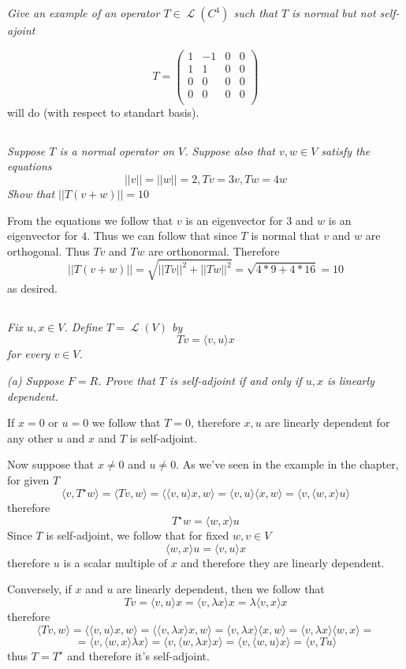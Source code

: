 \documentclass[11pt,oneside,titlepage]{book}
\DeclareMathOperator \map {\mathcal {L}}
\newcommand{\eangle}[1]{\langle #1 \rangle}
\begin{document}
\textit{Give an example of an operator $T \in \map(C^4)$ such that $T$ is normal
  but not self-ajoint}

$$T =
\begin{pmatrix}
  1 & -1 & 0 & 0 \\
  1 & 1 & 0 & 0 \\
  0 & 0 & 0 & 0 \\
  0 & 0 & 0 & 0 \\
\end{pmatrix}
$$
will do (with respect to standart basis).

\subsection{}

\textit{Suppose $T$ is a normal operator on $V$. Suppose also that $v, w \in V$ satisfy the
  equations
  $$||v|| = ||w|| = 2, Tv = 3v, Tw = 4w$$
  Show that $||T(v + w)|| = 10$
}

From the equations we follow that $v$ is an eigenvector for $3$ and $w$ is an eigenvector for $4$.
Thus we can follow that since $T$ is normal that $v$ and $w$ are orthogonal. Thus
$Tv$ and $Tw$ are orthonormal. Therefore 
$$||T(v + w)|| = \sqrt{||Tv||^2 + ||Tw||^2} = \sqrt{4 * 9 + 4 * 16} = 10$$
as desired.

\subsection{}

\textit{Fix $u, x \in V$. Define $T = \map(V)$ by
  $$Tv = \eangle{v, u} x$$
  for every $v \in V$.}

\textit{(a) Suppose $F = R$. Prove that $T$ is self-adjoint if and only if $u, x$ is linearly
  dependent.}

If $x = 0$ or $u = 0$  we follow that $T = 0$, therefore $x, u$ are linearly dependent for any
other $u$ and $x$ and $T$ is self-adjoint.

Now suppose that $x \neq 0$ and $u \neq 0$.
As we've seen in the example in the chapter, for given $T$
$$\eangle{v, T^\star w} = \eangle{Tv, w} = \eangle {\eangle{v, u} x, w} =
\eangle{v, u} \eangle {x, w} = \eangle{v, \eangle{w, x}u}$$
therefore
$$T^\star w = \eangle{w, x} u$$
Since $T$ is self-adjoint, we follow that for fixed $w, v \in V$
$$\eangle{w, x} u = \eangle{v, u} x$$
therefore $u$ is a scalar multiple of $x$ and therefore they are linearly dependent.

Conversely, if $x$ and $u$ are linearly dependent, then we follow that
$$Tv = \eangle{v, u} x = \eangle{v, \lambda x} x = \lambda  \eangle{v, x} x$$
therefore
$$\eangle{Tv, w} = \eangle{\eangle{v, u} x, w } = \eangle{\eangle{v, \lambda x} x, w } =
\eangle{v, \lambda x} \eangle{x, w } = \eangle{v, \lambda x} \eangle{w, x } =$$
$$ = 
\eangle{v, \eangle{w, x } \lambda x} = \eangle{v, \eangle{w, \lambda x }  x}  =
\eangle{v, \eangle{w, u }  x} = \eangle{v, Tu}$$
thus $T = T^\star$ and therefore it's self-adjoint.
\end{document}
